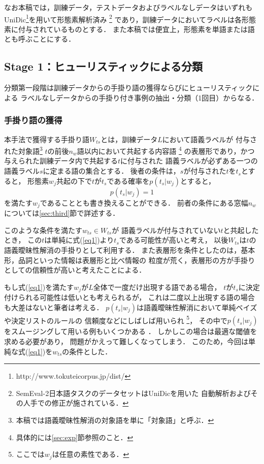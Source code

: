 \documentclass[japanese]{jnlp_1.4}
\begin{document}
なお本稿では，訓練データ，テストデータおよびラベルなしデータはいずれも
UniDic\footnote{http://www.tokuteicorpus.jp/dist/}を用いて形態素解析済み
\footnote{SemEval-2日本語タスクのデータセットはUniDicを用いた
自動解析およびその人手での修正が施されている．} であり，訓練データにおいてラベルは各形態素に付与されているものとする．
また本稿では便宜上，形態素を単語または語とも呼ぶことにする．



\subsection{Stage 1：ヒューリスティックによる分類}
\label{sec:first}

分類第一段階は訓練データからの手掛り語の獲得ならびにヒューリスティックによる
ラベルなしデータからの手掛り付き事例の抽出・分類（1回目）からなる．


\subsubsection{手掛り語の獲得}

本手法で獲得する手掛り語$W_{ts}$とは，訓練データ$L$において語義ラベルが
付与された対象語\footnote{本稿では語義曖昧性解消の対象語を単に「対象語」と呼ぶ．} $t$の前後$n_w$語以内において共起する内容語
\footnote{具体的には\ref{sec:exp}節参照のこと．} の表層形であり，かつ与えられた訓練データ内で共起する$t$に付与された
語義ラベルが必ずある一つの語義ラベル$s$に定まる語の集合とする．
後者の条件は，$s$が付与された$t$を$t_s$とすると，
形態素$w_j$共起の下で$t$が$t_s$である確率を$p(t_s|w_j)$とすると，
\begin{equation}
p(t_s|w_j)=1 \label{eq1}
\end{equation}
を満たす$w_j$であることとも書き換えることができる．
前者の条件にある窓幅$n_w$については\ref{sec:third}節で詳述する．

このような条件を満たす$w_{ts} \in W_{ts}$が
語義ラベルが付与されていない$t$と共起したとき，
この$t$は単純に式(\ref{eq1})より$t_s$である可能性が高いと考え，
以後$W_{ts}$は$t$の語義曖昧性解消の手掛りとして利用する．
また表層形を条件としたのは，基本形，品詞といった情報は表層形と比べ情報の
粒度が荒く，表層形の方が手掛りとしての信頼性が高いと考えたことによる．

もし式(\ref{eq1})を満たす$w_j$が$L$全体で一度だけ出現する語である場合，
$t$が$t_s$に決定付けられる可能性は低いとも考えられるが，
これは二度以上出現する語の場合も大差はないと筆者は考える．
$p(t_s|w_j)$は語義曖昧性解消において単純ベイズや決定リストのルールの
信頼度などにしばしば用いられ
\footnote{ここでは$w_j$は任意の素性である．}，
その中で$p(t_s|w_j)$をスムージングして用いる例もいくつかある
\cite{Yarowsky95,Yagi01,Tsuruoka02}．
しかしこの場合は最適な閾値を求める必要があり，
問題がかえって難しくなってしまう．
このため，今回は単純な式(\ref{eq1})を$w_{ts}$の条件とした．
\end{document}

